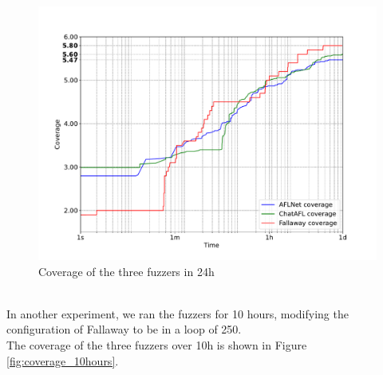 \begin{figure}[H]
    \centering
    \includegraphics[width=1\textwidth]{Images/coverage_over_time_lighttpd-1day.pdf}
    \caption{Coverage of the three fuzzers in 24h}
    \label{fig:coverage_1day}
\end{figure}
\phantom{}\\
In another experiment, we ran the fuzzers for 10 hours, modifying the configuration of Fallaway to be in a loop of 250.
\\The coverage of the three fuzzers over 10h is shown in Figure \ref{fig:coverage_10hours}.


